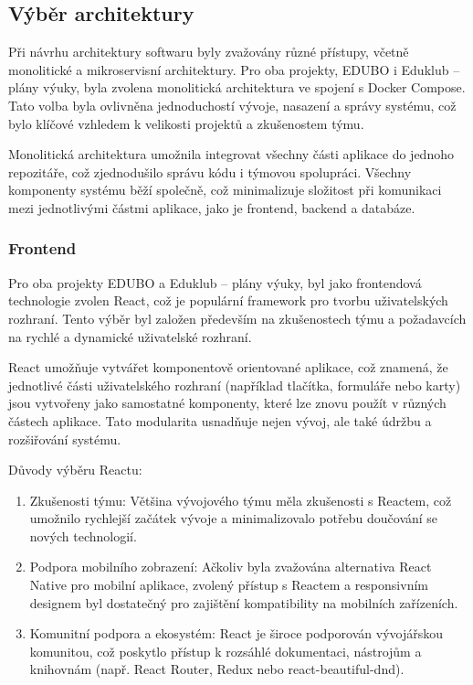 \documentclass[male,czech,api_bc]{kitheses}
\begin{document}
\subsection{Výběr architektury}

Při návrhu architektury softwaru byly zvažovány různé přístupy, včetně monolitické a mikroservisní architektury. Pro oba projekty, EDUBO i Eduklub – plány výuky, byla zvolena monolitická architektura ve spojení s Docker Compose. Tato volba byla ovlivněna jednoduchostí vývoje, nasazení a správy systému, což bylo klíčové vzhledem k velikosti projektů a zkušenostem týmu.

Monolitická architektura umožnila integrovat všechny části aplikace do jednoho repozitáře, což zjednodušilo správu kódu i týmovou spolupráci. Všechny komponenty systému běží společně, což minimalizuje složitost při komunikaci mezi jednotlivými částmi aplikace, jako je frontend, backend a databáze.

\subsubsection{Frontend}

Pro oba projekty EDUBO a Eduklub – plány výuky, byl jako frontendová technologie zvolen React, což je populární framework pro tvorbu uživatelských rozhraní. Tento výběr byl založen především na zkušenostech týmu a požadavcích na rychlé a dynamické uživatelské rozhraní.

React umožňuje vytvářet komponentově orientované aplikace, což znamená, že jednotlivé části uživatelského rozhraní (například tlačítka, formuláře nebo karty) jsou vytvořeny jako samostatné komponenty, které lze znovu použít v různých částech aplikace. Tato modularita usnadňuje nejen vývoj, ale také údržbu a rozšiřování systému.

Důvody výběru Reactu:
\begin{enumerate}
	\item Zkušenosti týmu: Většina vývojového týmu měla zkušenosti s Reactem, což umožnilo rychlejší začátek vývoje a minimalizovalo potřebu doučování se nových technologií.
	\item Podpora mobilního zobrazení: Ačkoliv byla zvažována alternativa React Native pro mobilní aplikace, zvolený přístup s Reactem a responsivním designem byl dostatečný pro zajištění kompatibility na mobilních zařízeních.
	\item Komunitní podpora a ekosystém: React je široce podporován vývojářskou komunitou, což poskytlo přístup k rozsáhlé dokumentaci, nástrojům a knihovnám (např. React Router, Redux nebo react-beautiful-dnd).
\end{enumerate}
\end{document}
